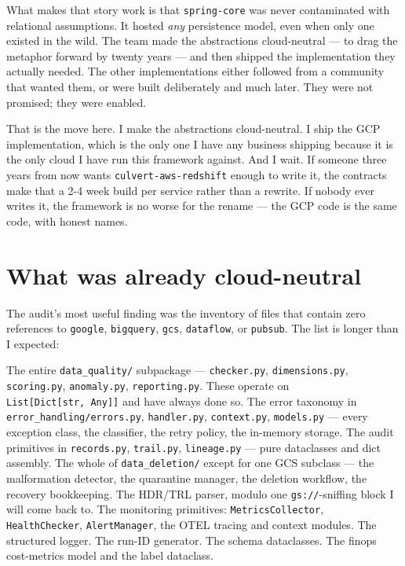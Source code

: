 \documentclass[
  11pt,
  british,
  oneside]{book}
\begin{document}
What makes that story work is that \texttt{spring-core} was never
contaminated with relational assumptions. It hosted \emph{any}
persistence model, even when only one existed in the wild. The team made
the abstractions cloud-neutral --- to drag the metaphor forward by
twenty years --- and then shipped the implementation they actually
needed. The other implementations either followed from a community that
wanted them, or were built deliberately and much later. They were not
promised; they were enabled.

That is the move here. I make the abstractions cloud-neutral. I ship the
GCP implementation, which is the only one I have any business shipping
because it is the only cloud I have run this framework against. And I
wait. If someone three years from now wants
\texttt{culvert-aws-redshift} enough to write it, the contracts make
that a 2-4 week build per service rather than a rewrite. If nobody ever
writes it, the framework is no worse for the rename --- the GCP code is
the same code, with honest names.

\hypertarget{what-was-already-cloud-neutral}{%
\section{What was already
cloud-neutral}\label{what-was-already-cloud-neutral}}

The audit's most useful finding was the inventory of files that contain
zero references to \texttt{google}, \texttt{bigquery}, \texttt{gcs},
\texttt{dataflow}, or \texttt{pubsub}. The list is longer than I
expected:

The entire \texttt{data\_quality/} subpackage --- \texttt{checker.py},
\texttt{dimensions.py}, \texttt{scoring.py}, \texttt{anomaly.py},
\texttt{reporting.py}. These operate on
\texttt{List{[}Dict{[}str,\ Any{]}{]}} and have always done so. The
error taxonomy in \texttt{error\_handling/errors.py},
\texttt{handler.py}, \texttt{context.py}, \texttt{models.py} --- every
exception class, the classifier, the retry policy, the in-memory
storage. The audit primitives in \texttt{records.py}, \texttt{trail.py},
\texttt{lineage.py} --- pure dataclasses and dict assembly. The whole of
\texttt{data\_deletion/} except for one GCS subclass --- the
malformation detector, the quarantine manager, the deletion workflow,
the recovery bookkeeping. The HDR/TRL parser, modulo one
\texttt{gs://}-sniffing block I will come back to. The monitoring
primitives: \texttt{MetricsCollector}, \texttt{HealthChecker},
\texttt{AlertManager}, the OTEL tracing and context modules. The
structured logger. The run-ID generator. The schema dataclasses. The
finops cost-metrics model and the label dataclass.
\end{document}
